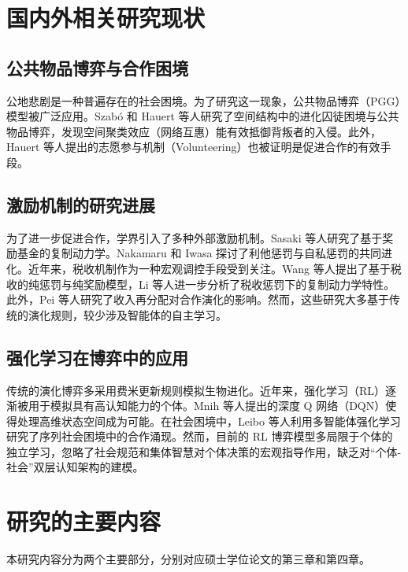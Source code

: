 \documentclass[UTF8,a4paper,12pt]{ctexart}
\begin{document}
\section{国内外相关研究现状}

\subsection{公共物品博弈与合作困境}
公地悲剧是一种普遍存在的社会困境\cite{hardin1968}。为了研究这一现象，公共物品博弈（PGG）模型被广泛应用\cite{szabo2002vol}。Szabó 和 Hauert 等人研究了空间结构中的进化囚徒困境与公共物品博弈，发现空间聚类效应（网络互惠）能有效抵御背叛者的入侵\cite{szabo2002evo}。此外，Hauert 等人提出的志愿参与机制（Volunteering）也被证明是促进合作的有效手段\cite{hauert2002}。

\subsection{激励机制的研究进展}
为了进一步促进合作，学界引入了多种外部激励机制。Sasaki 等人研究了基于奖励基金的复制动力学\cite{sasaki2011}。Nakamaru 和 Iwasa 探讨了利他惩罚与自私惩罚的共同进化\cite{nakamaru2006}。近年来，税收机制作为一种宏观调控手段受到关注。Wang 等人提出了基于税收的纯惩罚与纯奖励模型\cite{wang2021tax}，Li 等人进一步分析了税收惩罚下的复制动力学特性\cite{li2022}。此外，Pei 等人研究了收入再分配对合作演化的影响\cite{pei2017}。然而，这些研究大多基于传统的演化规则，较少涉及智能体的自主学习。

\subsection{强化学习在博弈中的应用}
传统的演化博弈多采用费米更新规则模拟生物进化\cite{szabo1998}。近年来，强化学习（RL）逐渐被用于模拟具有高认知能力的个体\cite{sutton2018}。Mnih 等人提出的深度 Q 网络（DQN）使得处理高维状态空间成为可能\cite{mnih2015}。在社会困境中，Leibo 等人利用多智能体强化学习研究了序列社会困境中的合作涌现\cite{leibo2017}。然而，目前的 RL 博弈模型多局限于个体的独立学习，忽略了社会规范和集体智慧对个体决策的宏观指导作用，缺乏对“个体-社会”双层认知架构的建模\cite{zhang2021}。
\section{研究的主要内容}

本研究内容分为两个主要部分，分别对应硕士学位论文的第三章和第四章。
\end{document}
